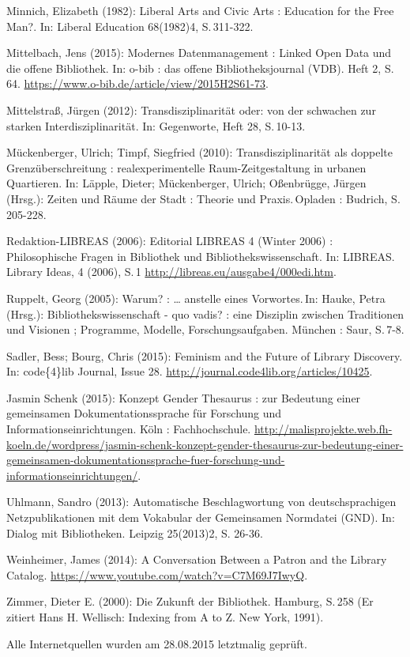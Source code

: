 Minnich, Elizabeth (1982): Liberal Arts and Civic Arts : Education for
the Free Man?. In: Liberal Education 68(1982)4, S.\,311-322.

Mittelbach, Jens (2015): Modernes Datenmanagement : Linked Open Data und
die offene Bibliothek. In: o-bib : das offene Bibliotheksjournal (VDB).
Heft 2, S.\,64. \url{https://www.o-bib.de/article/view/2015H2S61-73}.

Mittelstraß, Jürgen (2012): Transdisziplinarität oder: von der schwachen
zur starken Interdisziplinarität. In: Gegenworte, Heft 28, S.\,10-13.

Mückenberger, Ulrich; Timpf, Siegfried (2010): Transdisziplinarität als
doppelte Grenzüberschreitung : realexperimentelle Raum-Zeitgestaltung in
urbanen Quartieren. In: Läpple, Dieter; Mückenberger, Ulrich;
Oßenbrügge, Jürgen (Hrsg.): Zeiten und Räume der Stadt : Theorie und
Praxis.\,Opladen : Budrich, S.\,205-228.

Redaktion-LIBREAS (2006): Editorial LIBREAS 4 (Winter 2006) :
Philosophische Fragen in Bibliothek und Bibliothekswissenschaft. In:
LIBREAS.\,Library Ideas, 4 (2006), S.\,1
\url{http://libreas.eu/ausgabe4/000edi.htm}.

Ruppelt, Georg (2005): Warum? : \ldots{} anstelle eines Vorwortes.\,In:
Hauke, Petra (Hrsg.): Bibliothekswissenschaft - quo vadis? : eine
Disziplin zwischen Traditionen und Visionen ; Programme, Modelle,
Forschungsaufgaben. München : Saur, S.\,7-8.

Sadler, Bess; Bourg, Chris (2015): Feminism and the Future of Library
Discovery. In: code\{4\}lib Journal, Issue 28.
\url{http://journal.code4lib.org/articles/10425}.

Jasmin Schenk (2015): Konzept Gender Thesaurus : zur Bedeutung einer
gemeinsamen Dokumentationssprache für Forschung und
Informationseinrichtungen. Köln : Fachhochschule.
\url{http://malisprojekte.web.fh-koeln.de/wordpress/jasmin-schenk-konzept-gender-thesaurus-zur-bedeutung-einer-gemeinsamen-dokumentationssprache-fuer-forschung-und-informationseinrichtungen/}.

Uhlmann, Sandro (2013): Automatische Beschlagwortung von
deutschsprachigen Netzpublikationen mit dem Vokabular der Gemeinsamen
Normdatei (GND). In: Dialog mit Bibliotheken. Leipzig 25(2013)2, S.
26-36.

Weinheimer, James (2014): A Conversation Between a Patron and the
Library Catalog. \url{https://www.youtube.com/watch?v=C7M69J7IwyQ}.

Zimmer, Dieter E. (2000): Die Zukunft der Bibliothek. Hamburg, S.\,258
(Er zitiert Hans H. Wellisch: Indexing from A to Z. New York, 1991).

Alle Internetquellen wurden am 28.08.2015 letztmalig geprüft. 
